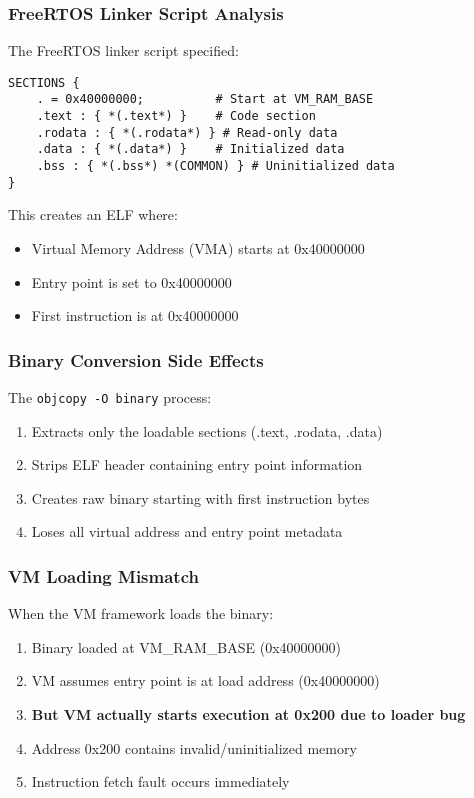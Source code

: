 \documentclass[11pt,a4paper]{article}
\begin{document}
\subsubsection{FreeRTOS Linker Script Analysis}

The FreeRTOS linker script specified:

\begin{lstlisting}[language=ld, caption=FreeRTOS Linker Script]
SECTIONS {
    . = 0x40000000;          # Start at VM_RAM_BASE
    .text : { *(.text*) }    # Code section
    .rodata : { *(.rodata*) } # Read-only data
    .data : { *(.data*) }    # Initialized data
    .bss : { *(.bss*) *(COMMON) } # Uninitialized data
}
\end{lstlisting}

This creates an ELF where:
\begin{itemize}
\item Virtual Memory Address (VMA) starts at 0x40000000
\item Entry point is set to 0x40000000
\item First instruction is at 0x40000000
\end{itemize}

\subsubsection{Binary Conversion Side Effects}

The \texttt{objcopy -O binary} process:
\begin{enumerate}
\item Extracts only the loadable sections (.text, .rodata, .data)
\item Strips ELF header containing entry point information
\item Creates raw binary starting with first instruction bytes
\item Loses all virtual address and entry point metadata
\end{enumerate}

\subsubsection{VM Loading Mismatch}

When the VM framework loads the binary:
\begin{enumerate}
\item Binary loaded at VM\_RAM\_BASE (0x40000000)
\item VM assumes entry point is at load address (0x40000000)
\item \textbf{But VM actually starts execution at 0x200 due to loader bug}
\item Address 0x200 contains invalid/uninitialized memory
\item Instruction fetch fault occurs immediately
\end{enumerate}
\end{document}
